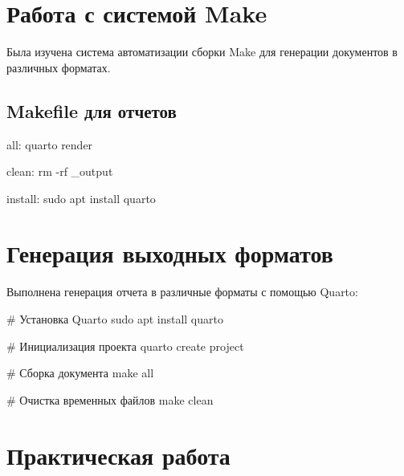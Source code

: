 \documentclass[
  12pt,
  a4paper,
  DIV=11,
  numbers=noendperiod]{scrreprt}
\newenvironment{Shaded}{\begin{snugshade}}{\end{snugshade}}
\newcommand{\CommentTok}[1]{\textcolor[rgb]{0.37,0.37,0.37}{#1}}
\newcommand{\DecValTok}[1]{\textcolor[rgb]{0.68,0.00,0.00}{#1}}
\newcommand{\ErrorTok}[1]{\textcolor[rgb]{0.68,0.00,0.00}{#1}}
\newcommand{\ExtensionTok}[1]{\textcolor[rgb]{0.00,0.23,0.31}{#1}}
\newcommand{\FunctionTok}[1]{\textcolor[rgb]{0.28,0.35,0.67}{#1}}
\newcommand{\NormalTok}[1]{\textcolor[rgb]{0.00,0.23,0.31}{#1}}
\begin{document}
\section{Работа с системой
Make}\label{ux440ux430ux431ux43eux442ux430-ux441-ux441ux438ux441ux442ux435ux43cux43eux439-make}

Была изучена система автоматизации сборки Make для генерации документов
в различных форматах.

\subsection{Makefile для
отчетов}\label{makefile-ux434ux43bux44f-ux43eux442ux447ux435ux442ux43eux432}

\begin{Shaded}
\begin{Highlighting}[]
\DecValTok{all:}
\ErrorTok{    }\NormalTok{quarto render}

\DecValTok{clean:}
\ErrorTok{    }\NormalTok{rm {-}rf \_output}

\DecValTok{install:}
\ErrorTok{    }\NormalTok{sudo apt install quarto}
\end{Highlighting}
\end{Shaded}

\section{Генерация выходных
форматов}\label{ux433ux435ux43dux435ux440ux430ux446ux438ux44f-ux432ux44bux445ux43eux434ux43dux44bux445-ux444ux43eux440ux43cux430ux442ux43eux432}

Выполнена генерация отчета в различные форматы с помощью Quarto:

\begin{Shaded}
\begin{Highlighting}[]
\CommentTok{\# Установка Quarto}
\FunctionTok{sudo}\NormalTok{ apt install quarto}

\CommentTok{\# Инициализация проекта}
\ExtensionTok{quarto}\NormalTok{ create project}

\CommentTok{\# Сборка документа}
\FunctionTok{make}\NormalTok{ all}

\CommentTok{\# Очистка временных файлов}
\FunctionTok{make}\NormalTok{ clean}
\end{Highlighting}
\end{Shaded}

\section{Практическая
работа}\label{ux43fux440ux430ux43aux442ux438ux447ux435ux441ux43aux430ux44f-ux440ux430ux431ux43eux442ux430}
\end{document}

